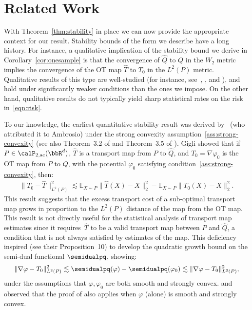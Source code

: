 \section{Related Work}
With Theorem~\ref{thm:stability} in place we can now provide the appropriate context for our result. 
Stability bounds of the form we describe have a long history. For instance, a qualitative implication of the stability bound we derive in Corollary~\ref{cor:onesample} is that   the convergence of $\widehat{Q}$ to $Q$ in the $W_2$ metric implies the convergence of the OT map $\widehat{T}$ to $T_0$ in the $L^2(P)$ metric.
Qualitative results of this type are well-studied (for instance, see~\citet[Exercise 2.17]{villani2003}, 
\citet[Proposition 1.7.11]{panaretos2020},
and
\cite{segers2022}), and hold under significantly weaker conditions than the ones we impose. On the other hand, qualitative results do not typically yield sharp statistical rates on the risk in~\eqref{eqn:risk}.

To our knowledge, 
the earliest quantitative stability result
was derived by~\cite{gigli2011}
(who attributed it to Ambrosio)
 under the strong 
convexity 
assumption~\ref{ass:strong-convexity}
(see also Theorem~3.2 of \cite{ambrosio2019} and Theorem~3.5 of
\cite{li2021quantitative}).
Gigli showed that if  
$P\in \calP_{2,\mathrm{ac}}(\bbR^d)$, $\hat T$ is a   transport map from $P$ to $\hat Q$,
and $T_0=\nabla\varphi_0$ is the OT map from $P$ to $Q$, with the potential $\varphi_0$ satisfying condition~\ref{ass:strong-convexity}, then:
\begin{align*}
    \|T_0 - \hat T\|_{L^2(P)}^2 \lesssim \mathbb{E}_{X\sim P}\|\hat T(X) - X\|_2^2 - \mathbb{E}_{X \sim P} \|T_0(X) - X\|_2^2.
\end{align*}
This result suggests that the excess transport cost of a sub-optimal transport map grows in proportion to the $L^2(P)$ distance of the map from the OT map. This result is not directly useful for the statistical analysis of transport map estimates since it requires~$\hat T$ to be a valid transport map between $P$ and $\hat Q$, a condition that is not always satisfied by estimates of the map.
This deficiency inspired \citet{hutter2021} (see their Proposition~10) to develop the quadratic growth bound on the semi-dual functional $\semidualpq$, showing:
\begin{align*}
 \|\nabla \varphi - T_0\|_{L^2(P)}^2 \lesssim \semidualpq(\varphi) - \semidualpq(\varphi_0) \lesssim \|\nabla \varphi - T_0\|_{L^2(P)}^2,
\end{align*}
under the assumptions that $\varphi, \varphi_0$ are both smooth and strongly convex. \citet{vacher2021convex, muzellec2021} and \citet{makkuva2020} 
observed that the proof of \cite{hutter2021} also applies when $\varphi$ (alone) is smooth and strongly convex.
 
